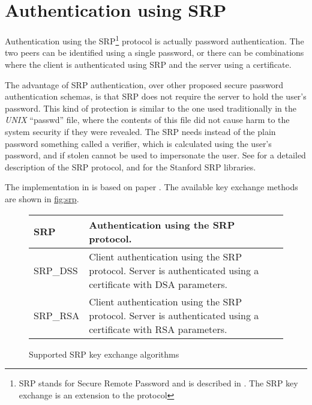 \section{Authentication using SRP}

Authentication using the SRP\footnote{SRP stands for Secure Remote Password and 
is described in \cite{RFC2945}. The SRP key exchange is an extension to the \tlsI{} protocol}
protocol is actually password authentication. The two peers can be identified using a
single password, or there can be combinations where the client is 
authenticated using SRP and the server using a certificate.
\par
The advantage of SRP authentication, over other proposed secure password 
authentication schemas, is that SRP does not require the server to hold
the user's password. This kind of protection is similar to the one used traditionally
in the \emph{UNIX} ``passwd'' file, where the contents of this file did not cause
harm to the system security if they were revealed.
The SRP needs instead of the plain password something called a verifier, 
which is calculated using the user's password, and if stolen cannot
be used to impersonate the user. See \cite{TOMSRP} for a detailed description
of the SRP protocol, and for the Stanford SRP libraries.

\par
The implementation in \gnutls{} is based on paper \cite{TLSSRP}.
The available key exchange methods are shown in \hyperref{figure}{figure }{}{fig:srp}.

\begin{figure}[hbtp]
\begin{tabular}{|l|p{9cm}|}

\hline
SRP & Authentication using the SRP protocol. 
\\
\hline
SRP\_DSS & Client authentication using the SRP protocol. Server is 
authenticated using a certificate with DSA parameters.
\\
\hline
SRP\_RSA & Client authentication using the SRP protocol. Server is 
authenticated using a certificate with RSA parameters.
\\
\hline
\end{tabular}

\caption{Supported SRP key exchange algorithms}
\label{fig:srp}

\end{figure}

